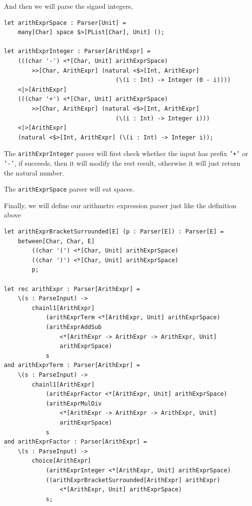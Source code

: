 And then we will parse the signed integers,

\begin{lstlisting}
let arithExprSpace : Parser[Unit] =
    many[Char] space $>[PList[Char], Unit] ();

let arithExprInteger : Parser[ArithExpr] =
    (((char '-') <*[Char, Unit] arithExprSpace)
        >>[Char, ArithExpr] (natural <$>[Int, ArithExpr]
                                (\(i : Int) -> Integer (0 - i))))
    <|>[ArithExpr]
    (((char '+') <*[Char, Unit] arithExprSpace)
        >>[Char, ArithExpr] (natural <$>[Int, ArithExpr]
                                (\(i : Int) -> Integer i)))
    <|>[ArithExpr]
    (natural <$>[Int, ArithExpr] (\(i : Int) -> Integer i));
\end{lstlisting}

The \texttt{arithExprInteger} parser will first check whether the input has prefix \texttt{'+'} or \texttt{'-'}, if succeeds, then it will modify the rest result, otherwise it will just return the natural number.

The \texttt{arithExprSpace} parser will eat spaces.

Finally, we will define our arithmetrc expression parser just like the definition above

\begin{lstlisting}
let arithExprBracketSurrounded[E] (p : Parser[E]) : Parser[E] =
    between[Char, Char, E]
        ((char '(') <*[Char, Unit] arithExprSpace)
        ((char ')') <*[Char, Unit] arithExprSpace)
        p;

let rec arithExpr : Parser[ArithExpr] =
    \(s : ParseInput) ->
        chainl1[ArithExpr]
            (arithExprTerm <*[ArithExpr, Unit] arithExprSpace)
            (arithExprAddSub
                <*[ArithExpr -> ArithExpr -> ArithExpr, Unit]
                arithExprSpace)
            s
and arithExprTerm : Parser[ArithExpr] =
    \(s : ParseInput) ->
        chainl1[ArithExpr]
            (arithExprFactor <*[ArithExpr, Unit] arithExprSpace)
            (arithExprMulDiv
                <*[ArithExpr -> ArithExpr -> ArithExpr, Unit]
                arithExprSpace)
            s
and arithExprFactor : Parser[ArithExpr] =
    \(s : ParseInput) ->
        choice[ArithExpr]
            (arithExprInteger <*[ArithExpr, Unit] arithExprSpace)
            ((arithExprBracketSurrounded[ArithExpr] arithExpr)
                <*[ArithExpr, Unit] arithExprSpace)
            s;
\end{lstlisting}

